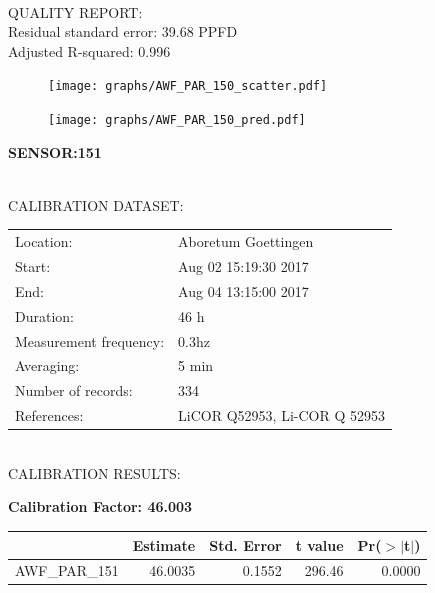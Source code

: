 \documentclass[oneside]{report}
\begin{document}
\hrulefill\\
QUALITY REPORT:\\
Residual standard error: 39.68 PPFD\\
Adjusted R-squared: 0.996



\begin{figure}[H]
  \centering
  \texttt{[image: graphs/AWF\_PAR\_150\_scatter.pdf]}
\end{figure}




\begin{figure}[H]
  \centering
  \texttt{[image: graphs/AWF\_PAR\_150\_pred.pdf]}
\end{figure}

\pagebreak


\begin{center}
\large{\textbf{SENSOR:151}}\\
\end{center}

\hrulefill\\
CALIBRATION DATASET:\\
\begin{table}[h!]
  \centering
  \label{tab:table1}
  \begin{tabular}{ll}
    Location: & Aboretum Goettingen\\ 
    
    
    Start:  & Aug 02 15:19:30 2017 \\
    End:   & Aug 04 13:15:00 2017\\ 
    Duration: & 46 h\\
    Measurement frequency: & 0.3hz\\
    Averaging:  &5 min\\
    Number of records: & 334 \\
    References: & LiCOR Q52953, Li-COR Q 52953 \\
  \end{tabular}
\end{table}

\hrulefill\\
CALIBRATION RESULTS:\\


\begin{center}
\textbf{\large{Calibration Factor: 46.003}}\\
\end{center}
\begin{table}[ht]
\centering
\begin{tabular}{rrrrr}
  \hline
 & Estimate & Std. Error & t value & Pr($>$$|$t$|$) \\ 
  \hline
AWF\_PAR\_151 & 46.0035 & 0.1552 & 296.46 & 0.0000 \\ 
   \hline
\end{tabular}
\end{table}
\end{document}
